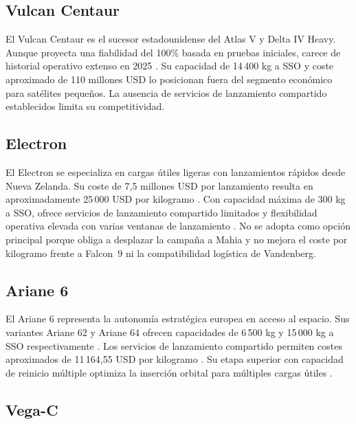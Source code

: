 \subsection{Vulcan Centaur}

El Vulcan Centaur es el sucesor estadounidense del Atlas V y Delta IV Heavy. Aunque proyecta una fiabilidad del 100\% basada en pruebas iniciales, carece de historial operativo extenso en 2025 \cite{semanticscholar2023}. Su capacidad de 14\,400 kg a SSO y coste aproximado de 110 millones USD lo posicionan fuera del segmento económico para satélites pequeños. La ausencia de servicios de lanzamiento compartido establecidos limita su competitividad.

\subsection{Electron}

El Electron se especializa en cargas útiles ligeras con lanzamientos rápidos desde Nueva Zelanda. Su coste de 7{,}5 millones USD por lanzamiento resulta en aproximadamente 25\,000 USD por kilogramo \cite{spaceinsider2023}. Con capacidad máxima de 300 kg a SSO, ofrece servicios de lanzamiento compartido limitados y flexibilidad operativa elevada con varias ventanas de lanzamiento \cite{wikipedia2024}. No se adopta como opción principal porque obliga a desplazar la campaña a Mahia y no mejora el coste por kilogramo frente a Falcon~9 ni la compatibilidad logística de Vandenberg.

\subsection{Ariane 6}

El Ariane 6 representa la autonomía estratégica europea en acceso al espacio. Sus variantes Ariane 62 y Ariane 64 ofrecen capacidades de 6\,500 kg y 15\,000 kg a SSO respectivamente \cite{esa2024}. Los servicios de lanzamiento compartido permiten costes aproximados de 11\,164{,}55 USD por kilogramo \cite{spaceinsider2023}. Su etapa superior con capacidad de reinicio múltiple optimiza la inserción orbital para múltiples cargas útiles \cite{esa2024}.

\subsection{Vega-C}

